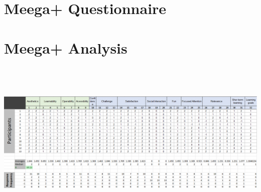 %
%
%                 

\chapter{Meega+ Questionnaire}
\label{sec:appendixd}



\chapter{Meega+ Analysis}
\label{sec:appendixe}
\newpage
\hspace{1cm}
\includegraphics[width=600px,height=300px, angle=270]{Appendices/MeegaAnalysis.png}

